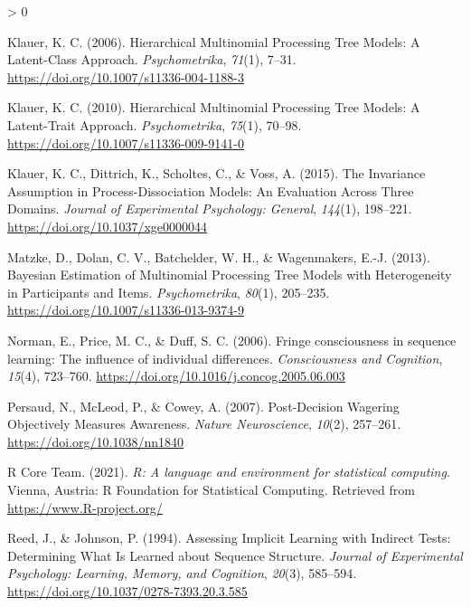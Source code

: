 \documentclass[
  english,
  man]{apa6}
\newlength{\cslhangindent}
\newenvironment{CSLReferences}[2] %
 {%
  \setlength{\parindent}{0pt}
  \ifodd #1 \everypar{\setlength{\hangindent}{\cslhangindent}}\ignorespaces\fi
  \ifnum #2 > 0
  \setlength{\parskip}{#2\baselineskip}
  \fi
 }%
 {}
\begin{document}
\begin{CSLReferences}{1}{0}
\leavevmode\hypertarget{ref-klauer_hierarchical_2006}{}%
Klauer, K. C. (2006). Hierarchical {Multinomial Processing Tree Models}: {A Latent}-{Class Approach}. \emph{Psychometrika}, \emph{71}(1), 7--31. \url{https://doi.org/10.1007/s11336-004-1188-3}

\leavevmode\hypertarget{ref-klauer_hierarchical_2010}{}%
Klauer, K. C. (2010). Hierarchical {Multinomial Processing Tree Models}: {A Latent}-{Trait Approach}. \emph{Psychometrika}, \emph{75}(1), 70--98. \url{https://doi.org/10.1007/s11336-009-9141-0}

\leavevmode\hypertarget{ref-klauer_invariance_2015}{}%
Klauer, K. C., Dittrich, K., Scholtes, C., \& Voss, A. (2015). The {Invariance Assumption} in {Process}-{Dissociation Models}: {An Evaluation Across Three Domains}. \emph{Journal of Experimental Psychology: General}, \emph{144}(1), 198--221. \url{https://doi.org/10.1037/xge0000044}

\leavevmode\hypertarget{ref-matzke_bayesian_2013}{}%
Matzke, D., Dolan, C. V., Batchelder, W. H., \& Wagenmakers, E.-J. (2013). Bayesian {Estimation} of {Multinomial Processing Tree Models} with {Heterogeneity} in {Participants} and {Items}. \emph{Psychometrika}, \emph{80}(1), 205--235. \url{https://doi.org/10.1007/s11336-013-9374-9}

\leavevmode\hypertarget{ref-norman_fringe_2006}{}%
Norman, E., Price, M. C., \& Duff, S. C. (2006). Fringe consciousness in sequence learning: {The} influence of individual differences. \emph{Consciousness and Cognition}, \emph{15}(4), 723--760. \url{https://doi.org/10.1016/j.concog.2005.06.003}

\leavevmode\hypertarget{ref-persaud_postdecision_2007}{}%
Persaud, N., McLeod, P., \& Cowey, A. (2007). Post-{Decision Wagering Objectively Measures Awareness}. \emph{Nature Neuroscience}, \emph{10}(2), 257--261. \url{https://doi.org/10.1038/nn1840}

\leavevmode\hypertarget{ref-R-base}{}%
R Core Team. (2021). \emph{R: A language and environment for statistical computing}. Vienna, Austria: R Foundation for Statistical Computing. Retrieved from \url{https://www.R-project.org/}

\leavevmode\hypertarget{ref-reed_assessing_1994}{}%
Reed, J., \& Johnson, P. (1994). Assessing {Implicit Learning} with {Indirect Tests}: {Determining What Is Learned} about {Sequence Structure}. \emph{Journal of Experimental Psychology: Learning, Memory, and Cognition}, \emph{20}(3), 585--594. \url{https://doi.org/10.1037/0278-7393.20.3.585}


\end{CSLReferences}
\end{document}
